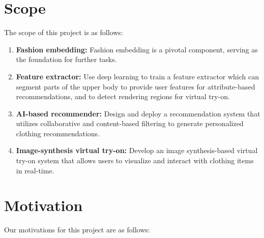 \section{Scope}
	The scope of this project is as follows:

	\begin{enumerate}
		\item \textbf{Fashion embedding:} Fashion embedding is a pivotal component, serving as the foundation for further tasks.
		\item \textbf{Feature extractor:} Use deep learning to train a feature extractor which can segment parts of the upper body to provide user features for attribute-based recommendations, and to detect rendering regions for virtual try-on.
		\item \textbf{AI-based recommender:} Design and deploy a recommendation system that utilizes collaborative and content-based filtering to generate personalized clothing recommendations.
		\item \textbf{Image-synthesis virtual try-on:} Develop an image synthesis-based virtual try-on system that allows users to visualize and interact with clothing items in real-time.
	\end{enumerate}

\section{Motivation}
	Our motivations for this project are as follows:

